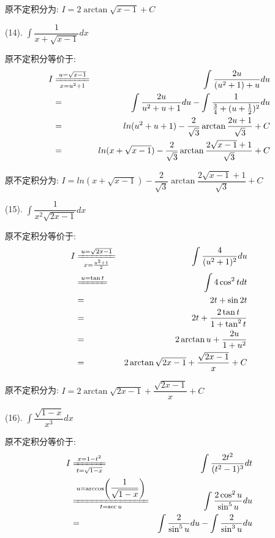\begin{anymark}[积分训练]
\begin{solution}
	原不定积分为:  $I=2\arctan \sqrt{x-1}+C$
	\end{solution}
	(14). $\int \dfrac{1}{x+\sqrt{x-1}}dx$
	\begin{solution}
		
		原不定积分等价于:  
		\begin{eqnarray*}
			I&\xlongequal[x=u^2+1]{u=\sqrt{x-1}}&\int \dfrac{2u}{(u^2+1)+u}du\\
			&=&\int \dfrac{2u}{u^2+u+1}du-\int \dfrac{1}{\frac{3}{4}+(u+\frac{1}{2})^2}du\\
			&=&ln(u^2+u+1)-\frac{2}{\sqrt{3}}\arctan\dfrac{2u+1}{\sqrt{3}}+C\\
			&=&ln(x+\sqrt{x-1})-\dfrac{2}{\sqrt{3}}\arctan\dfrac{2\sqrt{x-1}+1}{\sqrt{3}}+C
		\end{eqnarray*}
		
		原不定积分为:  $I=ln(x+\sqrt{x-1})-\dfrac{2}{\sqrt{3}}\arctan\dfrac{2\sqrt{x-1}+1}{\sqrt{3}}+C$
	\end{solution}
	(15). $\int \dfrac{1}{x^2\sqrt{2x-1}}dx$
	\begin{solution}
		
		原不定积分等价于:  
		\begin{eqnarray*}
			I&\xlongequal[x=\frac{u^2+1}{2}]{u=\sqrt{2x-1}}&\int \dfrac{4}{(u^2+1)^2}du\\
			&\xlongequal{u=\tan t}&\int 4\cos^2 tdt\\
			&=&2t+\sin 2t\\
			&=&2t+\dfrac{2\tan t}{1+\tan^2t}\\
			&=&2\arctan u+\dfrac{2u}{1+u^2}\\
			&=&2\arctan\sqrt{2x-1}+\dfrac{\sqrt{2x-1}}{x}+C
		\end{eqnarray*}
		
		原不定积分为:  $I=2\arctan\sqrt{2x-1}+\dfrac{\sqrt{2x-1}}{x}+C$
	\end{solution}
	(16). $\int \dfrac{\sqrt{1-x}}{x^3}dx$
	\begin{solution}
		
		原不定积分等价于:  
		\begin{eqnarray*}
			I&\xlongequal[t=\sqrt{1-x}]{x=1-t^2}&\int \dfrac{2t^2}{(t^2-1)^3}dt\\
			&\xlongequal[t=\sec u]{u=\arccos\left(\dfrac{1}{\sqrt{1-x}}\right)}&\int \dfrac{2\cos^2u}{\sin^5 u}du\\
			&=&\int \dfrac{2}{\sin^5 u}du-\int \dfrac{2}{\sin^3 u}du	
		\end{eqnarray*}
		

\end{solution}
\end{anymark}
